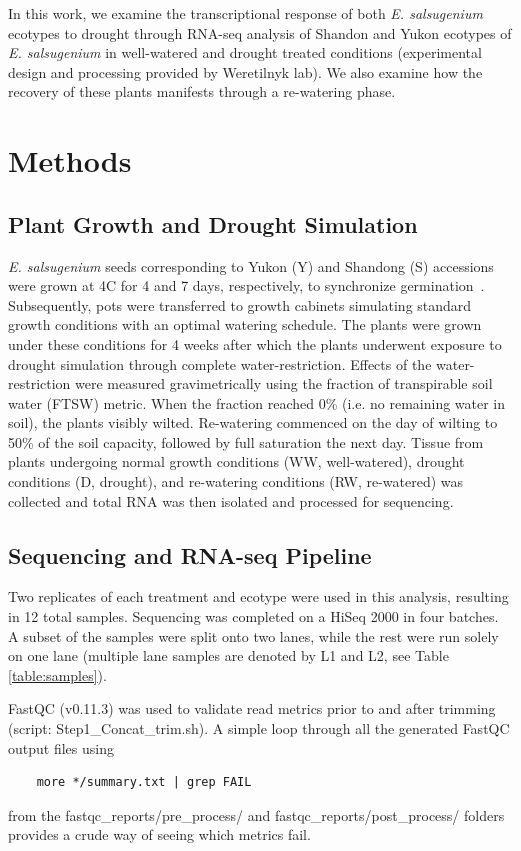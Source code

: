 \documentclass[12pt]{article}
\newcommand{\esal}{\textit{E. salsugenium}}
\begin{document}
	In this work, we examine the transcriptional response of both \esal{} ecotypes to drought through RNA-seq analysis of Shandon and Yukon ecotypes of \esal{} in well-watered and drought treated conditions (experimental design and processing provided by Weretilnyk lab). We also examine how the recovery of these plants manifests through a re-watering phase. 
	
	\section{Methods}
	\label{methods}
	\subsection{Plant Growth and Drought Simulation}
	\esal{} seeds corresponding to Yukon (Y) and Shandong (S) accessions were grown at 4\degree C for 4 and 7 days, respectively, to synchronize germination~\cite{macleod2015exposure}. Subsequently, pots were transferred to growth cabinets simulating standard growth conditions with an optimal watering schedule. The plants were grown under these conditions for 4 weeks after which the plants underwent exposure to drought simulation through complete water-restriction. Effects of the water-restriction were measured gravimetrically using the fraction of transpirable soil water (FTSW) metric. When the fraction reached 0\% (i.e. no remaining water in soil), the plants visibly wilted. Re-watering commenced on the day of wilting to 50\% of the soil capacity, followed by full saturation the next day. Tissue from plants undergoing normal growth conditions (WW, well-watered), drought conditions (D, drought), and re-watering conditions (RW, re-watered) was collected and total RNA was then isolated and processed for sequencing. 
	
	\subsection{Sequencing and RNA-seq Pipeline}
	Two replicates of each treatment and ecotype were used in this analysis, resulting in 12 total samples. Sequencing was completed on a HiSeq 2000 in four batches. A subset of the samples were split onto two lanes, while the rest were run solely on one lane (multiple lane samples are denoted by L1 and L2, see Table \ref{table:samples}). 
	
	FastQC (v0.11.3) was used to validate read metrics prior to and after trimming~\cite{andrews2010fastqc} (script: Step1\_Concat\_trim.sh). A simple loop through all the generated FastQC output files using
	\begin{lstlisting}
	more */summary.txt | grep FAIL
	\end{lstlisting}
	from the fastqc\_reports/pre\_process/ and fastqc\_reports/post\_process/ folders provides a crude way of seeing which metrics fail.
	
\end{document}

